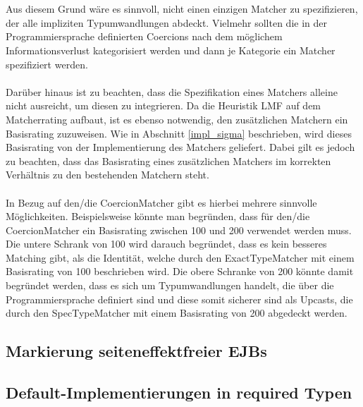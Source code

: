 \\\\
Aus diesem Grund wäre es sinnvoll, nicht einen einzigen Matcher zu spezifizieren, der alle impliziten Typumwandlungen abdeckt. Vielmehr sollten die in der Programmiersprache definierten Coercions nach dem möglichem Informationsverlust kategorisiert werden und dann je Kategorie ein Matcher spezifiziert werden.
\\\\
Darüber hinaus ist zu beachten, dass die Spezifikation eines Matchers alleine nicht ausreicht, um diesen zu integrieren. Da die Heuristik LMF auf dem Matcherrating aufbaut, ist es ebenso notwendig, den zusätzlichen Matchern ein Basisrating zuzuweisen. Wie in Abschnitt \ref{impl_sigma} beschrieben, wird dieses Basisrating von der Implementierung des Matchers geliefert. Dabei gilt es jedoch zu beachten, dass das Basisrating eines zusätzlichen Matchers im korrekten Verhältnis zu den bestehenden Matchern steht.
\\\\
In Bezug auf den/die CoercionMatcher gibt es hierbei mehrere sinnvolle Möglichkeiten. Beispielsweise könnte man begründen, dass für den/die CoercionMatcher ein Basisrating zwischen 100 und 200 verwendet werden muss. Die untere Schrank von 100 wird darauch begründet, dass es kein besseres Matching gibt, als die Identität, welche durch den ExactTypeMatcher mit einem Basisrating von 100 beschrieben wird. Die obere Schranke von 200 könnte damit begründet werden, dass es sich um Typumwandlungen handelt, die über die Programmiersprache definiert sind und diese somit sicherer sind als Upcasts, die durch den SpecTypeMatcher mit einem Basisrating von 200 abgedeckt werden.
\subsection{Markierung seiteneffektfreier EJBs}
\subsection{Default-Implementierungen in required Typen}